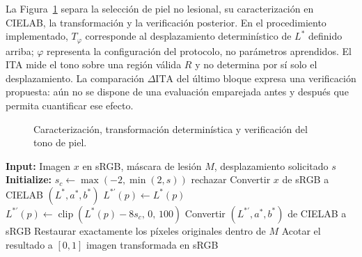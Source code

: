 La Figura~\ref{fig:flujo-transformacion-tono} separa la selección de piel no lesional, su caracterización en CIELAB, la transformación y la verificación posterior. En el procedimiento implementado, $T_\varphi$ corresponde al desplazamiento determinístico de $L^*$ definido arriba; $\varphi$ representa la configuración del protocolo, no parámetros aprendidos. El ITA mide el tono sobre una región válida $R$ y no determina por sí solo el desplazamiento. La comparación $\Delta\mathrm{ITA}$ del último bloque expresa una verificación propuesta: aún no se dispone de una evaluación emparejada antes y después que permita cuantificar ese efecto.

\begin{figure}[!htbp]
\caption{Caracterización, transformación determinística y verificación del tono de piel.}
\label{fig:flujo-transformacion-tono}
\centering

\par\smallskip
\raggedright\fontsize{11}{13}\selectfont\singlespacing
\par{}
\par
\end{figure}

\begin{algorithm}[htbp]
\fontsize{11}{13}\selectfont\singlespacing
\caption{Transformación determinística de tono de piel}
\label{alg:transformacion-tono}
\begin{algorithmic}[1]
\State \textbf{Input:} Imagen $x$ en sRGB, máscara de lesión $M$, desplazamiento solicitado $s$
\State \textbf{Initialize:} $s_c \gets \max(-2,\min(2,s))$ 
  \State \Return rechazar 
\EndIf
\State Convertir $x$ de sRGB a CIELAB $(L^*,a^*,b^*)$
    \State $L^{*\prime}(p) \gets L^*(p)$ 
  \Else
    \State $L^{*\prime}(p) \gets \operatorname{clip}(L^*(p)-8s_c,\,0,\,100)$ 
  \EndIf
\EndFor
\State Convertir $(L^{*\prime},a^*,b^*)$ de CIELAB a sRGB
\State Restaurar exactamente los píxeles originales dentro de $M$
\State Acotar el resultado a $[0,1]$
\State \Return imagen transformada en sRGB
\end{algorithmic}
\end{algorithm}

